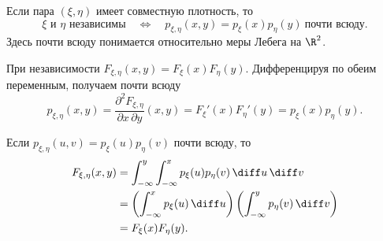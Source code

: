 \begin{theorem}
    Если пара $(\xi,\eta)$ имеет совместную плотность, то
    \[
        \xi\text{ и }\eta\text{ независимы}
        \quad\Longleftrightarrow\quad
        p_{\xi,\eta}(x,y)=p_\xi(x)p_\eta(y)
        \ \text{почти всюду}.
    \]
    Здесь почти всюду понимается относительно меры Лебега на $\R^2$.
\end{theorem}

\begin{Proof}[Необходимость]
    При независимости $F_{\xi,\eta}(x,y)=F_\xi(x)F_\eta(y)$.
    Дифференцируя по обеим переменным, получаем почти всюду
    \[
        p_{\xi,\eta}(x,y)
        =\frac{\partial^2F_{\xi,\eta}}{\partial x\,\partial y}(x,y)
        =F_\xi'(x)F_\eta'(y)=p_\xi(x)p_\eta(y).
    \]
\end{Proof}

\begin{Proof}[Достаточность]
    Если $p_{\xi,\eta}(u,v)=p_\xi(u)p_\eta(v)$ почти всюду, то
    \[
        \begin{aligned}
            F_{\xi,\eta}(x,y)
            &=\int_{-\infty}^{y}\int_{-\infty}^{x}
                p_\xi(u)p_\eta(v)\,\diff u\,\diff v\\
            &=\left(\int_{-\infty}^{x}p_\xi(u)\,\diff u\right)
              \left(\int_{-\infty}^{y}p_\eta(v)\,\diff v\right)\\
            &=F_\xi(x)F_\eta(y).
        \end{aligned}
    \]
\end{Proof}
\endgroup

